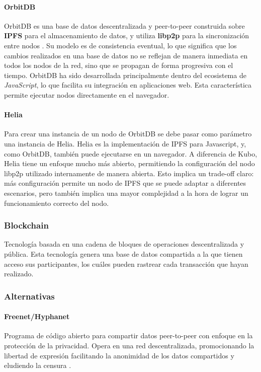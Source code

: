 \paragraph{OrbitDB}
OrbitDB es una base de datos descentralizada y peer-to-peer construida sobre \textbf{IPFS} para el almacenamiento de datos, y utiliza \textbf{libp2p} para la sincronización entre nodos \cite{orbitdb}. Su modelo es de consistencia eventual, lo que significa que los cambios realizados en una base de datos no se reflejan de manera inmediata en todos los nodos de la red, sino que se propagan de forma progresiva con el tiempo.
OrbitDB ha sido desarrollada principalmente dentro del ecosistema de \textit{JavaScript}, lo que facilita su integración en aplicaciones web. Esta característica permite ejecutar nodos directamente en el navegador.

\paragraph{Helia} Para crear una instancia de un nodo de OrbitDB se debe pasar como parámetro una instancia de Helia. Helia \cite{helia} es la implementación de IPFS para Javascript, y, como OrbitDB, también puede ejecutarse en un navegador. A diferencia de Kubo, Helia tiene un enfoque mucho más abierto, permitiendo la configuración del nodo libp2p utilizado internamente de manera abierta. Esto implica un trade-off claro: más configuración permite un nodo de IPFS que se puede adaptar a diferentes escenarios, pero también implica una mayor complejidad a la hora de lograr un funcionamiento correcto del nodo.

\subsubsection{Blockchain}
Tecnología basada en una cadena de bloques de operaciones descentralizada y pública.  Esta tecnología genera una base de datos compartida a la que tienen acceso sus participantes, los cuáles pueden rastrear cada transacción que hayan realizado.\parencite{blockchain}


\subsubsection{Alternativas}
\paragraph{Freenet/Hyphanet}
Programa de código abierto para compartir datos peer-to-peer con enfoque en la protección de la privacidad. Opera en una red descentralizada, promocionando la libertad de expresión facilitando la anonimidad de los datos compartidos y eludiendo la censura \cite{freenet} \cite{hyphanet}.

